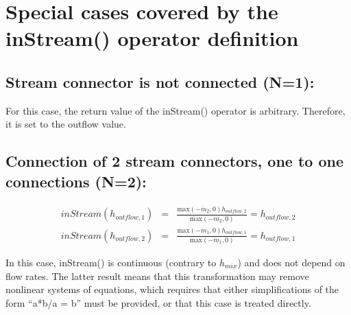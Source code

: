 \documentclass[10pt,a4paper]{report}
\def\doublelabel#1{\label{#1}}
\begin{document}
\section{Special cases covered by the inStream() operator definition}\doublelabel{special-cases-covered-by-the-instream-operator-definition}
\subsection{Stream connector is not connected (N=1):}\doublelabel{stream-connector-is-not-connected-n-1}
For this case, the return value of the inStream() operator is arbitrary.
Therefore, it is set to the outflow value.

\subsection{Connection of 2 stream connectors, one to one connections (N=2):}\doublelabel{connection-of-2-stream-connectors-one-to-one-connections-n-2}

\begin{eqnarray*}
inStream(h_{outflow,1})&=&\frac{\text{max}(-\dot{m}_2,0)h_{outflow,2}}{\text{max}(-\dot{m}_2,0)}=h_{outflow,2}\\
inStream(h_{outflow,2})&=&\frac{\text{max}(-\dot{m}_1,0)h_{outflow,1}}{\text{max}(-\dot{m}_1,0)}=h_{outflow,1}
\end{eqnarray*}

In this case, inStream() is continuous (contrary to $h_{mix}$) and does not
depend on flow rates. The latter result means that this transformation
may remove nonlinear systems of equations, which requires that either
simplifications of the form ``a*b/a = b'' must be provided, or that this
case is treated directly.
\end{document}
